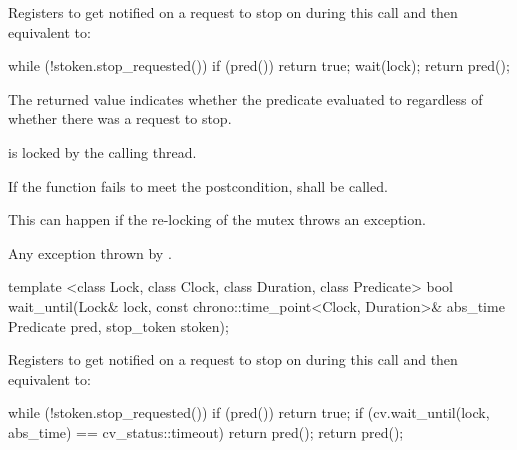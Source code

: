 {\begin{itemdescr}

 \pnum\effects Registers  to get notified on a request to stop on 
               during this call and then equivalent to:
\begin{codeblock}
while (!stoken.stop_requested()) {
  if (pred())
    return true;
  wait(lock);
}
return pred();
\end{codeblock}

 \pnum \begin{note} The returned value indicates whether the predicate evaluated to
         regardless of whether there was a request to stop. \end{note}

 \pnum \postconditions {} is locked by the calling thread.

 \pnum \remarks
        If the function fails to meet the postcondition, 
        shall be called.
        \begin{note} This can happen if the re-locking of the mutex throws an exception. \end{note}

 \pnum \throws 
        Any exception thrown by .


\end{itemdescr}




\begin{itemdecl}
template <class Lock, class Clock, class Duration, class Predicate>
  bool wait_until(Lock& lock,
                  const chrono::time_point<Clock, Duration>& abs_time
                  Predicate pred,
                  stop_token stoken);
\end{itemdecl}

\begin{itemdescr}
 \pnum\effects Registers  to get notified on a request to stop on 
                during this call and then equivalent to:
\begin{codeblock}
while (!stoken.stop_requested()) {
  if (pred())
    return true;
  if (cv.wait_until(lock, abs_time) == cv_status::timeout)
    return pred();
}
return pred();
\end{codeblock}


\end{itemdescr}}
